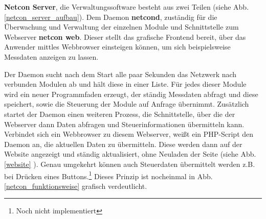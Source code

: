 \documentclass[a4paper,14pt,headsepline]{scrartcl}
\begin{document}
\textbf{Netcon Server}, die Verwaltungssoftware besteht aus zwei Teilen (siehe Abb. \ref{netcon_server_aufbau}). Dem Daemon \textbf{netcond}, zuständig für die Überwachung und Verwaltung der einzelnen Module und Schnittstelle zum Webserver \textbf{netcon web}. Dieser stellt das grafische Frontend bereit, über das Anwender mittles Webbrowser einsteigen können, um sich beispielsweise Messdaten anzeigen zu lassen. 

\begin{figure}[h]
\begin{center}
\end{center}
\end{figure}

\newpage

Der Daemon sucht nach dem Start alle paar Sekunden das Netzwerk nach verbunden Modulen ab und hält diese in einer Liste. Für jedes dieser Module wird ein neuer Programmfaden erzeugt, der ständig Messdaten abfragt und diese speichert, sowie die Steuerung der Module auf Anfrage übernimmt. Zusätzlich startet der Daemon einen weiteren Prozess, die Schnittstelle, über die der Webserver dann Daten abfragen und Steuerinformationen übermitteln kann. Verbindet sich ein Webbrowser zu diesem Webserver, weißt ein PHP-Script den Daemon an, die aktuellen Daten zu übermitteln. Diese werden dann auf der Website angezeigt und ständig aktualisiert, ohne Neuladen der Seite (siehe Abb. \ref{website} ). Genau umgekehrt können auch Steuerdaten übermittelt werden z.B. bei Drücken eines Buttons.\footnote{Noch nicht implementiert} Dieses Prinzip ist nocheinmal in Abb. \ref{netcon_funktionsweise} grafisch verdeutlicht.

\begin{figure}[h]
\begin{center}
\end{center}
\end{figure}
\end{document}

